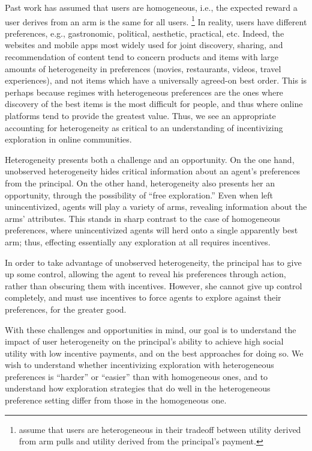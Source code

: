 Past work has assumed that users are homogeneous, i.e., the expected
reward a user derives from an arm is the same for all users.%
\footnote{\citet{han2015incentivizing} assume that users are
heterogeneous in their tradeoff between utility derived from arm pulls
and utility derived from the principal's payment.}
In reality, users have different preferences, e.g., gastronomic,
political, aesthetic, practical, etc.
Indeed, the websites and mobile apps most widely used for joint discovery,
sharing, and recommendation of content tend to concern products and items 
with large amounts of heterogeneity in preferences (movies, restaurants,
videos, travel experiences), and not items which have a universally
agreed-on best order.
This is perhaps because regimes with heterogeneous preferences are the
ones where discovery of the best items is the most difficult for people, 
and thus where online
platforms tend to provide the greatest value.  Thus, we see an appropriate
accounting for heterogeneity as critical to an understanding of incentivizing
exploration in online communities.

Heterogeneity presents both a challenge and an opportunity.
On the one hand, unobserved heterogeneity hides critical
information about an agent's preferences from the principal.
On the other hand, heterogeneity also presents her an opportunity,
through the possibility of ``free exploration.''
Even when left unincentivized, agents will
play a variety of arms, revealing information about the arms' attributes.
This stands in sharp contrast to the case of homogeneous preferences,
where unincentivized agents will herd onto a single apparently best arm;
thus, effecting essentially any exploration at all requires incentives.

In order to take advantage of unobserved heterogeneity,
the principal has to give up some control, allowing the agent to
reveal his preferences through action, rather than obscuring them with
incentives.
However, she cannot give up control completely,
and must use incentives to force agents to explore against their
preferences, for the greater good. 

With these challenges and opportunities in mind, our goal is to understand the
impact of user heterogeneity on the principal's ability to achieve
high social utility with low incentive payments,
and on the best approaches for doing so.
We wish to understand whether incentivizing exploration with
heterogeneous preferences  is ``harder'' or ``easier'' than with
homogeneous ones,
and to understand how exploration strategies that do well in the
heterogeneous preference setting differ from those in the homogeneous one.

